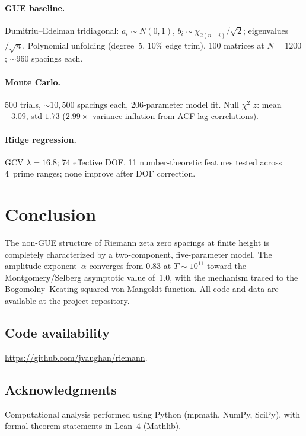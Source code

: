 \documentclass[11pt,a4paper]{article}
\begin{document}
\paragraph{GUE baseline.} Dumitriu--Edelman tridiagonal: $a_i \sim N(0,1)$, $b_i \sim \chi_{2(n-i)}/\!\sqrt{2}$; eigenvalues$/\!\sqrt{n}$.
Polynomial unfolding (degree~5, 10\% edge trim).
100 matrices at $N = 1200$; ${\sim}960$ spacings each.

\paragraph{Monte Carlo.} 500 trials, ${\sim}10{,}500$ spacings each, 206-parameter model fit. Null $\chi^2$ $z$: mean $+3.09$, std $1.73$ ($2.99\times$ variance inflation from ACF lag correlations).

\paragraph{Ridge regression.} GCV $\lambda = 16.8$; 74 effective DOF. 11 number-theoretic features tested across 4~prime ranges; none improve after DOF correction.

\section{Conclusion}

The non-GUE structure of Riemann zeta zero spacings at finite height is completely characterized by a two-component, five-parameter model.
The amplitude exponent~$\alpha$ converges from $0.83$ at $T \sim 10^{11}$ toward the Montgomery/Selberg asymptotic value of~1.0, with the mechanism traced to the Bogomolny--Keating squared von Mangoldt function.
All code and data are available at the project repository.

\subsection*{Code availability}
\url{https://github.com/jvaughan/riemann}.

\subsection*{Acknowledgments}
Computational analysis performed using Python (mpmath, NumPy, SciPy), with formal theorem statements in Lean~4 (Mathlib).
\end{document}
